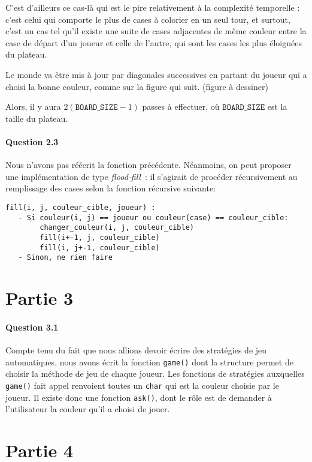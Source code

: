 \documentclass[a4paper]{article}
\newcommand{\boardsize}{\ensuremath{\mathtt{BOARD\_SIZE}}}
\begin{document}
C'est d'ailleurs ce cas-là qui est le pire relativement à la complexité 
temporelle : c'est celui qui comporte le plus de cases à colorier en un seul 
tour, et surtout, c'est un cas tel qu'il existe une suite de cases adjacentes 
de même couleur entre la case de départ d'un joueur et celle de l'autre, qui 
sont les cases les plus éloignées du plateau.

Le monde va être mis à jour par diagonales successives en partant du joueur qui 
a choisi la bonne couleur, comme sur la figure qui suit. (figure à dessiner)

Alors, il y aura $2(\boardsize-1)$ passes à effectuer, où \boardsize{} est la 
taille du plateau. 

    \paragraph{Question 2.3}
    Nous n'avons pas réécrit la fonction précédente. Néanmoins, on peut 
proposer une implémentation de type \emph{flood-fill}~: il s'agirait de 
procéder récursivement au remplissage des cases selon la fonction récursive 
suivante:
\begin{lstlisting}
fill(i, j, couleur_cible, joueur) :
   - Si couleur(i, j) == joueur ou couleur(case) == couleur_cible:
        changer_couleur(i, j, couleur_cible)
        fill(i+-1, j, couleur_cible)
        fill(i, j+-1, couleur_cible)
   - Sinon, ne rien faire
\end{lstlisting}
    \section{Partie 3}
    \paragraph{Question 3.1} Compte tenu du fait que nous allions devoir 
écrire des stratégies de jeu automatiques, nous avons écrit la fonction 
\texttt{game()} dont la structure permet de choisir la méthode de jeu de chaque 
joueur. Les fonctions de stratégies auxquelles \texttt{game()} fait appel 
renvoient toutes un \texttt{char} qui est la couleur choisie par le joueur.
Il existe donc une fonction \texttt{ask()}, dont le rôle est de demander à 
l'utilisateur la couleur qu'il a choisi de jouer. 

    \section{Partie 4}
\end{document}
